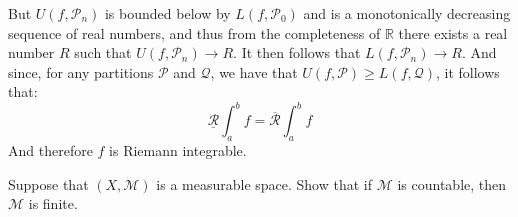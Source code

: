 \documentclass[crop=false,class=article]{standalone}                           %
\begin{document}
\begin{solution}
\begin{equation}
            \end{equation}
            But $U(f,\mathcal{P}_{n})$ is bounded below by $L(f,\mathcal{P}_{0})$
            and is a monotonically decreasing sequence of real numbers, and thus
            from the completeness of $\mathbb{R}$ there exists a real number $R$
            such that $U(f,\mathcal{P}_{n})\rightarrow{R}$. It then follows that
            $L(f,\mathcal{P}_{n})\rightarrow{R}$. And since, for any partitions
            $\mathcal{P}$ and $\mathcal{Q}$, we have that
            $U(f,\mathcal{P})\geq{L}(f,\mathcal{Q})$, it follows that:
            \begin{equation}
                \underline{\mathcal{R}}\int_{a}^{b}f
                =\overline{\mathcal{R}}\int_{a}^{b}f
            \end{equation}
            And therefore $f$ is Riemann integrable.
        \end{solution}
        \begin{problem}
            Suppose that $(X,\mathcal{M})$ is a measurable space. Show that if
            $\mathcal{M}$ is countable, then $\mathcal{M}$ is finite.
        \end{problem}
\end{document}
